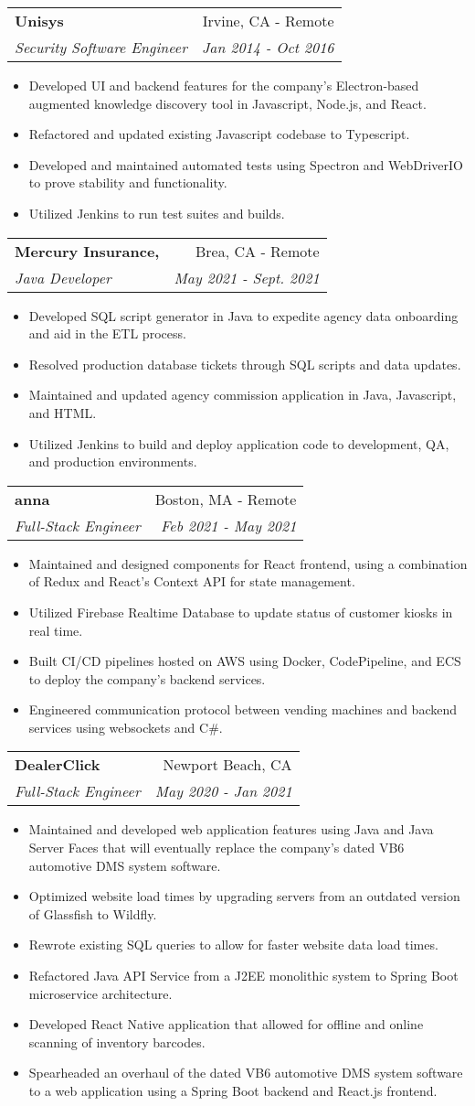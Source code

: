 \documentclass[letterpaper,11pt]{article}
\makeatletter
\newcommand{\resumeItem}[1]{
  \item\small{
    {#1 \vspace{-2pt}}
  }
}
\newcommand{\resumeSubheading}[4]{
  \vspace{-1pt}\item
    \begin{tabular*}{0.97\textwidth}[t]{l@{\extracolsep{\fill}}r}
      \textbf{#1} & #2 \\
      \textit{\small#3} & \textit{\small #4} \\
    \end{tabular*}\vspace{-5pt}
}
\newcommand{\resumeItemListStart}{\begin{itemize}}
\newcommand{\resumeItemListEnd}{\end{itemize}\vspace{-5pt}}
\makeatother
\begin{document}
    \resumeSubheading
      {Unisys}{Irvine, CA - Remote}
      {Security Software Engineer}{Jan 2014 - Oct 2016}
      \resumeItemListStart
	 \resumeItem
	{Developed UI and backend features for the company's Electron-based augmented knowledge discovery tool in Javascript, Node.js, and React.}
	 \resumeItem	
	{Refactored and updated existing Javascript codebase to Typescript.}
	 \resumeItem	
	{Developed and maintained automated tests using Spectron and WebDriverIO to prove stability and functionality. }
	 \resumeItem	
	{Utilized Jenkins to run test suites and builds.}
      \resumeItemListEnd

    \resumeSubheading
      {Mercury Insurance,}{Brea, CA - Remote}
      {Java Developer}{May 2021 - Sept. 2021}
      \resumeItemListStart
	\resumeItem
	{Developed SQL script generator in Java to expedite agency data onboarding  and aid in the ETL process.}
	\resumeItem
	{Resolved production database tickets through SQL scripts and data updates.}
	\resumeItem
	{Maintained and updated agency commission application in Java, Javascript, and HTML.}
	\resumeItem
	{Utilized Jenkins to build and deploy application code to development, QA, and production environments.}
      \resumeItemListEnd

    \resumeSubheading
      {anna}{Boston, MA - Remote}
      {Full-Stack Engineer}{Feb 2021 - May 2021}
      \resumeItemListStart
	\resumeItem
	{Maintained and designed components for React frontend, using a combination of Redux and React's Context API for state management.}
	\resumeItem
	{Utilized Firebase Realtime Database to update status of customer kiosks in real time.}
	\resumeItem
	{Built CI/CD pipelines hosted on AWS using Docker, CodePipeline, and ECS to deploy the company's backend services.}
	\resumeItem
	{Engineered communication protocol between vending machines and backend services using websockets and C\#.}
      \resumeItemListEnd

    \resumeSubheading
      {DealerClick}{Newport Beach, CA }
      {Full-Stack Engineer}{May 2020 - Jan 2021}
      \resumeItemListStart
	\resumeItem
	{Maintained and developed web application features using Java and Java Server Faces that will eventually replace the company's dated VB6 automotive DMS system software.}
	\resumeItem
	{Optimized website load times by upgrading servers from an outdated version of Glassfish to Wildfly.}
	\resumeItem
	{Rewrote existing SQL queries to allow for faster website data load times. }
	\resumeItem
	{Refactored Java API Service from a J2EE monolithic system to Spring Boot microservice architecture.}
	\resumeItem
	{Developed React Native application that allowed for offline and online scanning of inventory barcodes.}
	\resumeItem
	{Spearheaded an overhaul of the dated VB6 automotive DMS system software to a web application using a Spring Boot backend and React.js frontend.}
      \resumeItemListEnd
\end{document}
